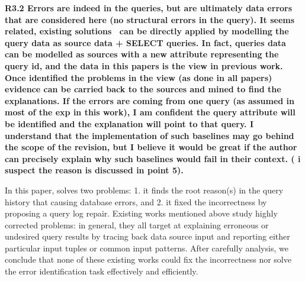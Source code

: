 \noindent \textbf{R3.2 Errors are indeed in the queries, but are ultimately data errors that are considered here (no structural errors in the query). It seems related, existing solutions~\cite{Wu13, roy2014formal, chalamalla2014,meliou2011tracing} can be directly applied by modelling the query data as source data + SELECT queries. In fact, queries data can be modelled as sources with a new attribute representing the query id, and the data in this papers is the view in previous work. Once identified the problems in the view (as done in all papers) evidence can be carried back to the sources and mined to find the explanations. If the errors are coming from one query (as assumed in most of the exp in this work), I am confident the query attribute will be identified and the explanation will point to that query. I understand that the implementation of such baselines may go behind the scope of the revision, but I believe it would be great if the author can precisely explain why such baselines would fail in their context. ( i suspect the reason is discussed in point 5). }

In this paper, \sys solves two problems: 1. it finds the root reason(s) in the query history that causing database errors, and 2. it fixed the incorrectness by proposing a query log repair. Existing works mentioned above study highly corrected problems: in general, they all target at explaining erroneous or undesired query results by tracing back data source input and reporting either particular input tuples or common input patterns. After carefully analysis, we conclude that none of these existing works could fix the incorrectness nor solve the error identification task effectively and efficiently. 

